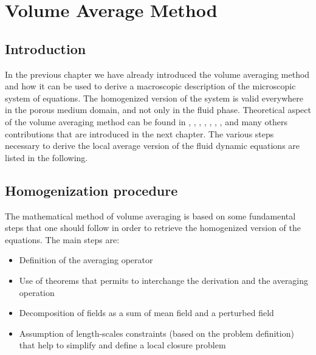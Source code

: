 \chapter{Volume Average Method}
\label{ch:vans}


\section{Introduction}

In the previous chapter we have already introduced the volume averaging method and how it can be used to derive a macroscopic description of the microscopic system of equations.
The homogenized version of the system is valid everywhere in the porous medium domain, and not only in the fluid phase.
Theoretical aspect of the volume averaging method can be found in \citet{whitaker2013method}, \citet{whitaker1986flow}, \citet{whitaker1996forchheimer}, \citet{quintard1994transport1}, \citet{quintard1994transport2}, \citet{quintard1994transport3}, \citet{quintard1994transport4}, \citet{quintard1994transport5} and many others contributions that are introduced in the next chapter.
The various steps necessary to derive the local average version of the fluid dynamic equations are listed in the following.

\section{Homogenization procedure}
The mathematical method of volume averaging is based on some fundamental steps that one should follow in order to retrieve the homogenized version of the equations.
The main steps are:
\begin{itemize}
\item Definition of the averaging operator
\item Use of theorems that permits to interchange the derivation and the averaging operation
\item Decomposition of fields as a sum of mean field and a perturbed field
\item Assumption of length-scales constraints (based on the problem definition) that help to simplify and define a local closure  problem
\end{itemize}

